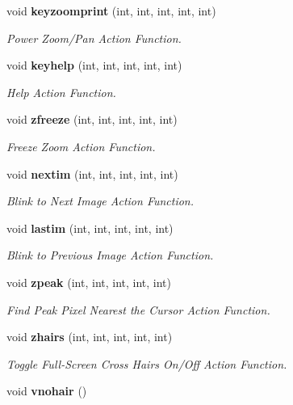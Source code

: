 \begin{CompactItemize}
void {\bf keyzoomprint} (int, int, int, int, int)
\begin{CompactList}\small\item\em Power Zoom/Pan Action Function. \item\end{CompactList}\item 
void {\bf keyhelp} (int, int, int, int, int)
\begin{CompactList}\small\item\em Help Action Function. \item\end{CompactList}\item 
void {\bf zfreeze} (int, int, int, int, int)
\begin{CompactList}\small\item\em Freeze Zoom Action Function. \item\end{CompactList}\item 
void {\bf nextim} (int, int, int, int, int)
\begin{CompactList}\small\item\em Blink to Next Image Action Function. \item\end{CompactList}\item 
void {\bf lastim} (int, int, int, int, int)
\begin{CompactList}\small\item\em Blink to Previous Image Action Function. \item\end{CompactList}\item 
void {\bf zpeak} (int, int, int, int, int)
\begin{CompactList}\small\item\em Find Peak Pixel Nearest the Cursor Action Function. \item\end{CompactList}\item 
void {\bf zhairs} (int, int, int, int, int)
\begin{CompactList}\small\item\em Toggle Full-Screen Cross Hairs On/Off Action Function. \item\end{CompactList}\item 
void {\bf vnohair} ()\label{xtv_8h_a114}


\end{CompactItemize}
